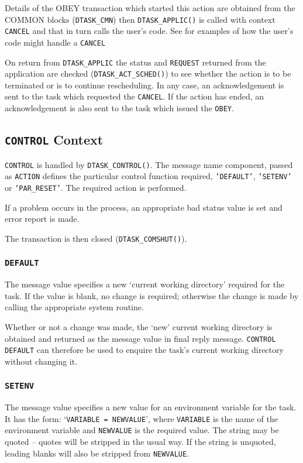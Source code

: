 \documentclass[twoside,11pt,nolof]{starlink}
\begin{document}
Details of the OBEY transaction which started this action are obtained from
the COMMON blocks (\texttt{DTASK\_CMN}) then \texttt{DTASK\_APPLIC()} is called
with context \texttt{CANCEL} and that in turn calls the user's code.
See
for examples of how the user's code might handle a
\texttt{CANCEL}

On return from \texttt{DTASK\_APPLIC} the status and \texttt{REQUEST} returned
from the application are checked (\texttt{DTASK\_ACT\_SCHED()}) to see whether
the action is to be terminated or is to continue rescheduling.
In any case, an acknowledgement is sent to the task which requested the
\texttt{CANCEL}.
If the action has ended, an acknowledgement is also sent to the task which
issued the \texttt{OBEY}.

\subsection{\label{control_context}\texttt{CONTROL} Context}
\texttt{CONTROL} is handled by \texttt{DTASK\_CONTROL()}.
The message name component, passed as \texttt{ACTION} defines the particular
control function required, \texttt{'DEFAULT'}, \texttt{'SETENV'} or
\texttt{'PAR\_RESET'}.
The required action is performed.

If a problem occurs in the process, an appropriate bad status value is set
and error report is made.

The transaction is then closed (\texttt{DTASK\_COMSHUT()}).

\subsubsection{\texttt{DEFAULT}}
The message value specifies a new `current working directory' required for the
task. If the value is blank, no change is required; otherwise the change is
made by calling the appropriate system routine.

Whether or not a change was made, the `new' current working directory is
obtained and returned as the message value in final reply message.
\texttt{CONTROL DEFAULT} can therefore be used to enquire the task's current
working directory without changing it.

\subsubsection{\texttt{SETENV}}
The message value specifies a new value for an environment variable for the
task. It has the form: `\texttt{VARIABLE = NEWVALUE}', where \texttt{VARIABLE}
is the name of the environment variable and \texttt{NEWVALUE} is the required
value. The string may be quoted -- quotes will be stripped in the usual way.
If the string is unquoted, leading blanks will also be stripped from
\texttt{NEWVALUE}.
\end{document}
